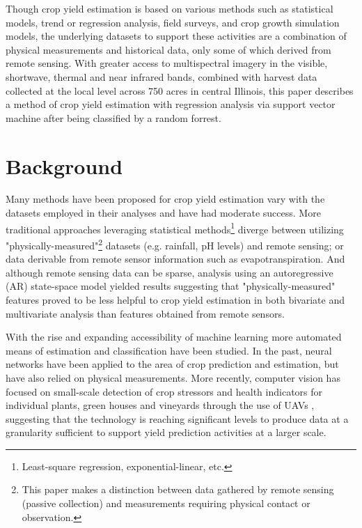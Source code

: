 \documentclass[conference]{IEEEtran}
\begin{document}
Though crop yield estimation is based on various methods such as statistical models, trend or regression analysis, field surveys, and crop growth simulation models\cite{PRASAD200626}, the underlying datasets to support these activities are a combination of physical measurements and historical data, only some of which derived from remote sensing.  With greater access to multispectral imagery in the visible, shortwave, thermal and near infrared bands, combined with harvest data collected at the local level across 750 acres in central Illinois, this paper describes a method of crop yield estimation with regression analysis via support vector machine after being classified by a random forrest.

\section{Background}
Many methods have been proposed for crop yield estimation vary with the datasets employed in their analyses and have had moderate success.  More traditional approaches leveraging statistical methods\footnote{Least-square regression, exponential-linear, etc.} diverge between utilizing "physically-measured"\footnote{This paper makes a distinction between data gathered by remote sensing (passive collection) and measurements requiring physical contact or observation.} datasets (e.g. rainfall, pH levels) \cite{JONES198291} and remote sensing\cite{Oroda_applicationof}; or data derivable from remote sensor information such as evapotranspiration.\cite{2006JD008351}  And although remote sensing data can be sparse, analysis using an autoregressive (AR) state-space model yielded results suggesting that "physically-measured" features proved to be less helpful to crop yield estimation in both bivariate and multivariate analysis than features obtained from remote sensors.\cite{WENDROTH2003250}

With the rise and expanding accessibility of machine learning more automated means of estimation and classification have been studied. In the past, neural networks have been applied to the area of crop prediction and estimation, but have also relied on physical measurements. \cite{Dahikar2014AgriculturalCY}\cite{KEHAGIAS199841}  More recently, computer vision has focused on small-scale detection of crop stressors and health indicators for individual plants\cite{12713927120180101}, green houses \cite{10260329020150501} and vineyards through the use of UAVs \cite{2938572220180130}, suggesting that the technology is reaching significant levels to produce data at a granularity sufficient to support yield prediction activities at a larger scale.
\end{document}

